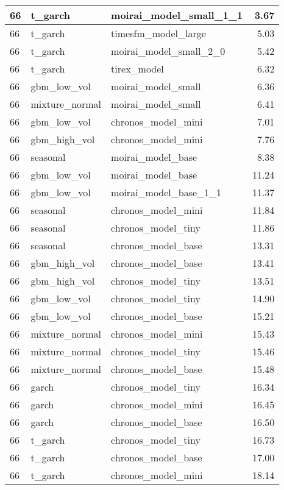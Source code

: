 {\begin{tabular}{lllr}
\midrule
66 & t\_garch & moirai\_model\_small\_1\_1 & 3.67 \\
\midrule
66 & t\_garch & timesfm\_model\_large & 5.03 \\
\midrule
66 & t\_garch & moirai\_model\_small\_2\_0 & 5.42 \\
\midrule
66 & t\_garch & tirex\_model & 6.32 \\
\midrule
66 & gbm\_low\_vol & moirai\_model\_small & 6.36 \\
\midrule
66 & mixture\_normal & moirai\_model\_small & 6.41 \\
\midrule
66 & gbm\_low\_vol & chronos\_model\_mini & 7.01 \\
\midrule
66 & gbm\_high\_vol & chronos\_model\_mini & 7.76 \\
\midrule
66 & seasonal & moirai\_model\_base & 8.38 \\
\midrule
66 & gbm\_low\_vol & moirai\_model\_base & 11.24 \\
\midrule
66 & gbm\_low\_vol & moirai\_model\_base\_1\_1 & 11.37 \\
\midrule
66 & seasonal & chronos\_model\_mini & 11.84 \\
\midrule
66 & seasonal & chronos\_model\_tiny & 11.86 \\
\midrule
66 & seasonal & chronos\_model\_base & 13.31 \\
\midrule
66 & gbm\_high\_vol & chronos\_model\_base & 13.41 \\
\midrule
66 & gbm\_high\_vol & chronos\_model\_tiny & 13.51 \\
\midrule
66 & gbm\_low\_vol & chronos\_model\_tiny & 14.90 \\
\midrule
66 & gbm\_low\_vol & chronos\_model\_base & 15.21 \\
\midrule
66 & mixture\_normal & chronos\_model\_mini & 15.43 \\
\midrule
66 & mixture\_normal & chronos\_model\_tiny & 15.46 \\
\midrule
66 & mixture\_normal & chronos\_model\_base & 15.48 \\
\midrule
66 & garch & chronos\_model\_tiny & 16.34 \\
\midrule
66 & garch & chronos\_model\_mini & 16.45 \\
\midrule
66 & garch & chronos\_model\_base & 16.50 \\
\midrule
66 & t\_garch & chronos\_model\_tiny & 16.73 \\
\midrule
66 & t\_garch & chronos\_model\_base & 17.00 \\
\midrule
66 & t\_garch & chronos\_model\_mini & 18.14 \\
\bottomrule
\end{tabular}
}